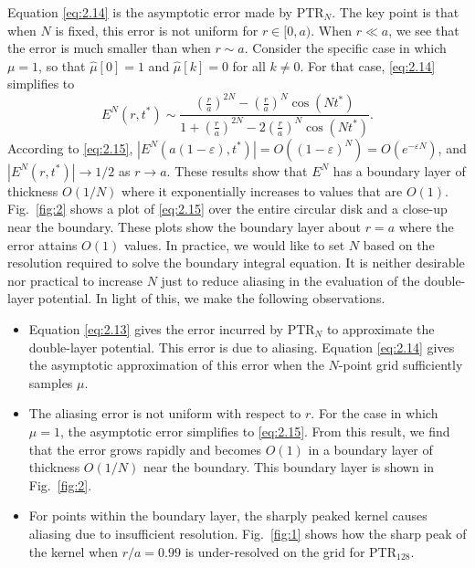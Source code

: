 \documentclass{article}[12pt]
\renewcommand{\epsilon}{\varepsilon}
\numberwithin{equation}{section}
\begin{document}
Equation \eqref{eq:2.14} is the asymptotic error made by
PTR$_{N}$. The key point is that
%
  when $N$ is fixed, 
%
this error is not uniform for $r \in [0,a)$. When $r \ll a$, we see
that the error is much smaller than when $r \sim a$.  Consider the
specific case in which $\mu = 1$, so that $\hat{\mu}[0] = 1$ and
$\hat{\mu}[k] = 0$ for all $k \neq 0$. For that case, \eqref{eq:2.14}
simplifies to
\begin{equation}
  E^{N}(r,t^{\ast}) \sim \frac{\left( \frac{r}{a} \right)^{2N} -
    \left( \frac{r}{a} \right)^{N} \cos (N t^{\ast})}{1 + \left(
      \frac{r}{a} \right)^{2N} - 2 \left( \frac{r}{a} \right)^{N} \cos
    (N t^{\ast})}. 
  \label{eq:2.15}
\end{equation}
According to \eqref{eq:2.15},
$| E^{N}(a(1-\epsilon),t^{\ast}) | = O((1-\epsilon)^{N}) =
O(e^{-\epsilon N})$,
and $| E^{N}(r,t^{\ast}) | \to 1/2$ as $r \to a$.  These results show
that $E^{N}$ has a boundary layer of thickness $O(1/N)$ where it
exponentially increases to values that are $O(1)$. Fig.~\ref{fig:2}
shows a plot of \eqref{eq:2.15} over the entire circular disk and a
close-up near the boundary.  These plots show the boundary layer about
$r = a$ where the error attains $O(1)$ values.  In practice, we would
like to set $N$ based on the resolution required to solve the boundary
integral equation. It is neither desirable nor practical to increase
$N$ just to reduce aliasing in the evaluation of the double-layer
potential.  In light of this, we make the following observations.
\begin{itemize}

\item Equation \eqref{eq:2.13} gives the error incurred by
PTR$_{N}$ to approximate the double-layer
  potential. This error is due to aliasing. Equation \eqref{eq:2.14}
  gives the asymptotic approximation of this error when the $N$-point
  grid sufficiently samples $\mu$.

\item The aliasing error is not uniform with respect to $r$. For the
  case in which $\mu = 1$, the asymptotic error simplifies to
  \eqref{eq:2.15}. From this result, we find that the error grows
  rapidly and becomes $O(1)$ in a boundary layer of thickness $O(1/N)$
  near the boundary. This boundary layer is shown in Fig.~\ref{fig:2}.

\item For points within the boundary layer, the sharply peaked kernel
  causes aliasing due to insufficient resolution.  Fig.~\ref{fig:1}
  shows how the sharp peak of the kernel when $r/a = 0.99$ is
  under-resolved on the grid for PTR$_{128}$.

\end{itemize}
\end{document}
